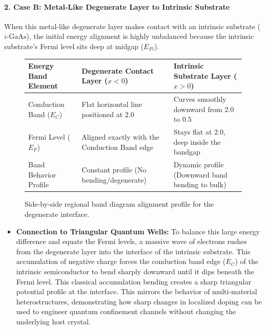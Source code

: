 \documentclass[
]{article}
\providecommand{\tightlist}{%
  \setlength{\itemsep}{0pt}\setlength{\parskip}{0pt}}
\begin{document}
\paragraph{2. Case B: Metal-Like Degenerate Layer to Intrinsic
Substrate}\label{case-b-metal-like-degenerate-layer-to-intrinsic-substrate-1}

When this metal-like degenerate layer makes contact with an intrinsic
substrate (\(i\text{-GaAs}\)), the initial energy alignment is highly
unbalanced because the intrinsic substrate's Fermi level sits deep at
midgap (\(E_{Fi}\)).

\begin{figure}[h!]
\centering
\renewcommand{\arraystretch}{1.4}
\begin{tabular}{|l|l|l|}
\hline
\textbf{Energy Band Element} & \textbf{Degenerate Contact Layer ($x < 0$)} & \textbf{Intrinsic Substrate Layer ($x > 0$)} \\ \hline
Conduction Band ($E_C$) & Flat horizontal line positioned at $2.0$ & Curves smoothly downward from $2.0$ to $0.5$ \\ \hline
Fermi Level ($E_F$) & Aligned exactly with the Conduction Band edge & Stays flat at $2.0$, deep inside the bandgap \\ \hline
Band Behavior Profile & Constant profile (No bending/degenerate) & Dynamic profile (Downward band bending to bulk) \\ \hline
\end{tabular}
\caption{Side-by-side regional band diagram alignment profile for the degenerate interface.}
\end{figure}

\begin{itemize}
\tightlist
\item
  \textbf{Connection to Triangular Quantum Wells:} To balance this large
  energy difference and equate the Fermi levels, a massive wave of
  electrons rushes from the degenerate layer into the interface of the
  intrinsic substrate. This accumulation of negative charge forces the
  conduction band edge (\(E_C\)) of the intrinsic semiconductor to bend
  sharply downward until it dips beneath the Fermi level. This classical
  accumulation bending creates a sharp triangular potential profile at
  the interface. This mirrors the behavior of multi-material
  heterostructures, demonstrating how sharp changes in localized doping
  can be used to engineer quantum confinement channels without changing
  the underlying host crystal.
\end{itemize}
\end{document}
